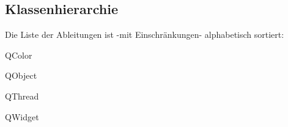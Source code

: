 \subsection{Klassenhierarchie}
Die Liste der Ableitungen ist -\/mit Einschränkungen-\/ alphabetisch sortiert\+:\begin{DoxyCompactList}
\item {}
\item {}
\item {}
\item Q\+Color\begin{DoxyCompactList}
\item {}
\end{DoxyCompactList}
\item Q\+Object\begin{DoxyCompactList}
\item {}
\end{DoxyCompactList}
\item Q\+Thread\begin{DoxyCompactList}
\item {}
\end{DoxyCompactList}
\item Q\+Widget\begin{DoxyCompactList}
\item {}
\end{DoxyCompactList}
\item {}
\item {}
\end{DoxyCompactList}

